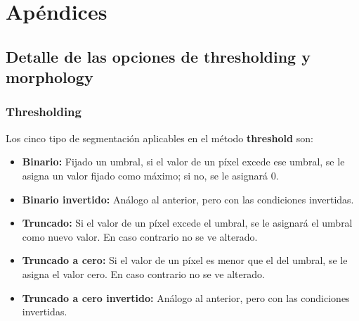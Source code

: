 \documentclass[a4paper,12pt]{article}
\begin{document}
\appendix
\section{Apéndices}
\subsection{Detalle de las opciones de thresholding y morphology}
\subsubsection{Thresholding}
\label{sec:thresh}
Los cinco tipo de segmentación aplicables en el método \textbf{threshold} son:
\begin{itemize}
\item \textbf{Binario:} Fijado un umbral, si el valor de un píxel excede ese umbral, se le asigna un valor fijado como máximo; si no, se le asignará 0.
\item \textbf{Binario invertido:} Análogo al anterior, pero con las condiciones invertidas.
\item \textbf{Truncado:} Si el valor de un píxel excede el umbral, se le asignará el umbral como nuevo valor. En caso contrario no se ve alterado.
\item \textbf{Truncado a cero:} Si el valor de un píxel es menor que el del umbral, se le asigna el valor cero. En caso contrario no se ve alterado.
\item \textbf{Truncado a cero invertido:} Análogo al anterior, pero con las condiciones invertidas.
\end{itemize}
\end{document}
